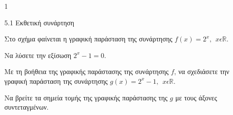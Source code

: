 \begin{ylh}{1}
\item 5.1 Εκθετική συνάρτηση
\end{ylh}
Στο σχήμα φαίνεται η γραφική παράσταση της συνάρτησης $f(x) = 2^{x},\ \ x\epsilon\mathbb{R}$.
\begin{center}
\end{center}
\begin{alist}
\item Να λύσετε την εξίσωση $2^{x} - 1 = 0$.
\item Με τη βοήθεια της γραφικής παράστασης της συνάρτησης $f$, να σχεδιάσετε την γραφική παράσταση της συνάρτησης $g(x) = 2^{x} - 1,\ \ x\epsilon\mathbb{R}$.
\item Να βρείτε τα σημεία τομής της γραφικής παράστασης της $g$ με τους άξονες συντεταγμένων.
\end{alist}

